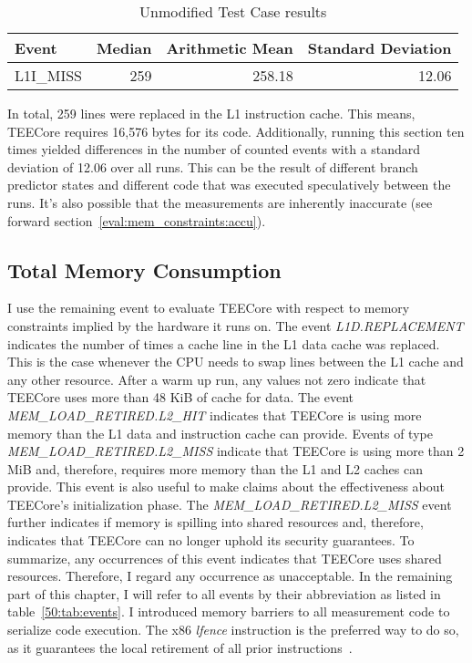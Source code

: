 \begin{table}[ht]
  \centering
  \begin{tabular}{ |l||r|r|r| }
    \hline
    Event            & Median & Arithmetic Mean & Standard Deviation \\
    \hline
    L1I\_MISS        & 259    & 258.18          & 12.06\\
    \hline
  \end{tabular}
  \caption{Unmodified Test Case results}
  \label{50:tab:code_size}
\end{table}

In total, 259 lines were replaced in the L1 instruction cache. This means,
TEECore requires 16,576 bytes for its code. Additionally, running this section
ten times yielded differences in the number of counted events with a standard
deviation of 12.06 over all runs. This can be the result of different branch
predictor states and different code that was executed speculatively between the
runs. It's also possible that the measurements are inherently inaccurate (see
forward section~\ref{eval:mem_constraints:accu}).

\subsection{Total Memory Consumption}
I use the remaining event to evaluate TEECore with respect to memory constraints
implied by the hardware it runs on. The event \textit{L1D.REPLACEMENT} indicates
the number of times a cache line in the L1 data cache was replaced. This is the
case whenever the CPU needs to swap lines between the L1 cache and any other
resource. After a warm up run, any values not zero indicate that TEECore uses
more than 48 KiB of cache for data. The event
\textit{MEM\_LOAD\_RETIRED.L2\_HIT} indicates that TEECore is using more memory
than the L1 data and instruction cache can provide. Events of type
\textit{MEM\_LOAD\_RETIRED.L2\_MISS} indicate that TEECore is using more than 2
MiB and, therefore, requires more memory than the L1 and L2 caches can provide.
This event is also useful to make claims about the effectiveness about TEECore's
initialization phase. The \textit{MEM\_LOAD\_RETIRED.L2\_MISS} event further
indicates if memory is spilling into shared resources and, therefore, indicates
that TEECore can no longer uphold its security guarantees. To summarize, any
occurrences of this event indicates that TEECore uses shared resources.
Therefore, I regard any occurrence as unacceptable. In the remaining part of
this chapter, I will refer to all events by their abbreviation as listed in
table~\ref{50:tab:events}. I introduced memory barriers to all measurement code
to serialize code execution. The x86 \textit{lfence} instruction is the
preferred way to do so, as it guarantees the local retirement of all prior
instructions~\cite{mccalpin2018comments, intel_sdm}.

